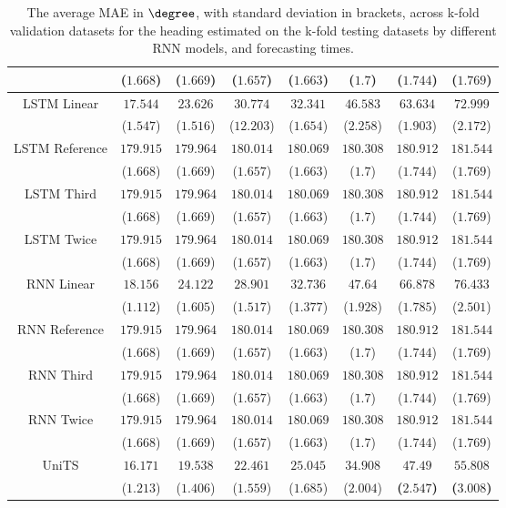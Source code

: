 \begin{table}[!ht]
{\begin{tabular}{|c|c|c|c|c|c|c|c|}
			 & ($1.668$) & ($1.669$) & ($1.657$) & ($1.663$) & ($1.7$) & ($1.744$) & ($1.769$) \\ \hline
			\multirow{2}{*}{LSTM Linear} & $17.544$ & $23.626$ & $30.774$ & $32.341$ & $46.583$ & $63.634$ & $72.999$ \\
			 & ($1.547$) & ($1.516$) & ($12.203$) & ($1.654$) & ($2.258$) & ($1.903$) & ($2.172$) \\ \hline
			\multirow{2}{*}{LSTM Reference} & $179.915$ & $179.964$ & $180.014$ & $180.069$ & $180.308$ & $180.912$ & $181.544$ \\
			 & ($1.668$) & ($1.669$) & ($1.657$) & ($1.663$) & ($1.7$) & ($1.744$) & ($1.769$) \\ \hline
			\multirow{2}{*}{LSTM Third} & $179.915$ & $179.964$ & $180.014$ & $180.069$ & $180.308$ & $180.912$ & $181.544$ \\
			 & ($1.668$) & ($1.669$) & ($1.657$) & ($1.663$) & ($1.7$) & ($1.744$) & ($1.769$) \\ \hline
			\multirow{2}{*}{LSTM Twice} & $179.915$ & $179.964$ & $180.014$ & $180.069$ & $180.308$ & $180.912$ & $181.544$ \\
			 & ($1.668$) & ($1.669$) & ($1.657$) & ($1.663$) & ($1.7$) & ($1.744$) & ($1.769$) \\ \hline
			\multirow{2}{*}{RNN Linear} & $18.156$ & $24.122$ & $28.901$ & $32.736$ & $47.64$ & $66.878$ & $76.433$ \\
			 & ($1.112$) & ($1.605$) & ($1.517$) & ($1.377$) & ($1.928$) & ($1.785$) & ($2.501$) \\ \hline
			\multirow{2}{*}{RNN Reference} & $179.915$ & $179.964$ & $180.014$ & $180.069$ & $180.308$ & $180.912$ & $181.544$ \\
			 & ($1.668$) & ($1.669$) & ($1.657$) & ($1.663$) & ($1.7$) & ($1.744$) & ($1.769$) \\ \hline
			\multirow{2}{*}{RNN Third} & $179.915$ & $179.964$ & $180.014$ & $180.069$ & $180.308$ & $180.912$ & $181.544$ \\
			 & ($1.668$) & ($1.669$) & ($1.657$) & ($1.663$) & ($1.7$) & ($1.744$) & ($1.769$) \\ \hline
			\multirow{2}{*}{RNN Twice} & $179.915$ & $179.964$ & $180.014$ & $180.069$ & $180.308$ & $180.912$ & $181.544$ \\
			 & ($1.668$) & ($1.669$) & ($1.657$) & ($1.663$) & ($1.7$) & ($1.744$) & ($1.769$) \\ \hline
			\multirow{2}{*}{UniTS} & $16.171$ & $19.538$ & $22.461$ & $25.045$ & $34.908$ & $\mathbf{47.49}$ & $\mathbf{55.808}$ \\
			 & ($1.213$) & ($1.406$) & ($1.559$) & ($1.685$) & ($2.004$) & \textbf{(}$\mathbf{2.547}$\textbf{)} & \textbf{(}$\mathbf{3.008}$\textbf{)} \\ \hline
		\end{tabular}
	}
	\caption{The average MAE in $\degree$, with standard deviation in brackets, across k-fold validation datasets for the heading estimated on the k-fold testing datasets by different RNN models, and forecasting times.}
	\label{tab:all_direction_MAE}
\end{table}

